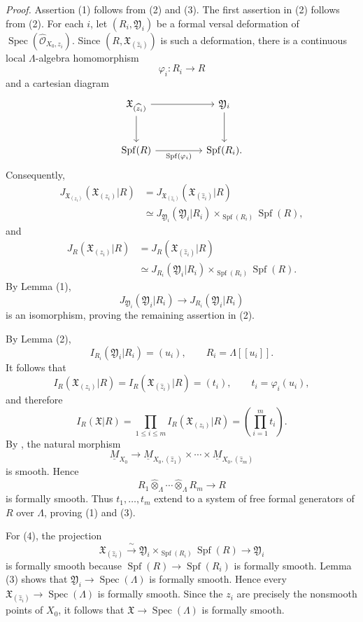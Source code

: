 \smallskip
\noindent\textit{Proof.}
Assertion (1) follows from (2) and (3). The first assertion in (2)
follows from (2). For each $i$, let $(R_i,\mathfrak Y_i)$ be a
formal versal deformation of
$\operatorname{Spec}(\widehat{\mathcal O}_{X_0,z_i})$. Since
$(R,\mathfrak X_{(\widehat z_i)})$ is such a deformation, there is a
continuous local $\Lambda$-algebra homomorphism
\[
\varphi_i:R_i\longrightarrow R
\]
and a cartesian diagram
\[
\begin{tikzcd}[column sep=huge,row sep=large]
\mathfrak X_{(\widehat z_i)}
  \arrow[r] \arrow[d]
& \mathfrak Y_i \arrow[d]\\
\operatorname{Spf}(R)
  \arrow[r,"{\operatorname{Spf}(\varphi_i)}"']
& \operatorname{Spf}(R_i).
\end{tikzcd}
\]
Consequently,
\[
\begin{aligned}
J_{\mathfrak X_{(z_i)}}(\mathfrak X_{(z_i)}|R)
&=J_{\mathfrak X_{(\widehat z_i)}}
   (\mathfrak X_{(\widehat z_i)}|R)\\
&\simeq
J_{\mathfrak Y_i}(\mathfrak Y_i|R_i)
 \times_{\operatorname{Spf}(R_i)}\operatorname{Spf}(R),
\end{aligned}
\]
and
\[
\begin{aligned}
J_R(\mathfrak X_{(z_i)}|R)
&=J_R(\mathfrak X_{(\widehat z_i)}|R)\\
&\simeq
J_{R_i}(\mathfrak Y_i|R_i)
 \times_{\operatorname{Spf}(R_i)}\operatorname{Spf}(R).
\end{aligned}
\]
By Lemma (1),
\[
J_{\mathfrak Y_i}(\mathfrak Y_i|R_i)
 \longrightarrow J_{R_i}(\mathfrak Y_i|R_i)
\]
is an isomorphism, proving the remaining assertion in (2).

By Lemma (2),
\[
I_{R_i}(\mathfrak Y_i|R_i)=(u_i),
\qquad R_i=\Lambda[[u_i]].
\]
It follows that
\[
I_R(\mathfrak X_{(z_i)}|R)
=I_R(\mathfrak X_{(\widehat z_i)}|R)
=(t_i),
\qquad t_i=\varphi_i(u_i),
\]
and therefore
\[
I_R(\mathfrak X|R)
=\prod_{1\leq i\leq m}I_R(\mathfrak X_{(z_i)}|R)
=\left(\prod_{i=1}^m t_i\right).
\]
By , the natural morphism
\[
\underline M_{X_0}\longrightarrow
\underline M_{X_0,(\widehat z_1)}\times\cdots\times
\underline M_{X_0,(\widehat z_m)}
\]
is smooth. Hence
\[
R_1\widehat\otimes_\Lambda\cdots
 \widehat\otimes_\Lambda R_m\longrightarrow R
\]
is formally smooth. Thus $t_1,\ldots,t_m$ extend to a system of free
formal generators of $R$ over $\Lambda$, proving (1) and (3).


For (4), the projection
\[
\mathfrak X_{(\widehat z_i)}
 \xrightarrow{\ \sim\ }
\mathfrak Y_i\times_{\operatorname{Spf}(R_i)}
 \operatorname{Spf}(R)
 \longrightarrow\mathfrak Y_i
\]
is formally smooth because
$\operatorname{Spf}(R)\longrightarrow\operatorname{Spf}(R_i)$ is
formally smooth. Lemma (3) shows that
$\mathfrak Y_i\longrightarrow\operatorname{Spec}(\Lambda)$ is
formally smooth. Hence every
$\mathfrak X_{(\widehat z_i)}\longrightarrow
\operatorname{Spec}(\Lambda)$ is formally smooth. Since the $z_i$
are precisely the nonsmooth points of $X_0$, it follows that
$\mathfrak X\longrightarrow\operatorname{Spec}(\Lambda)$ is formally
smooth.
